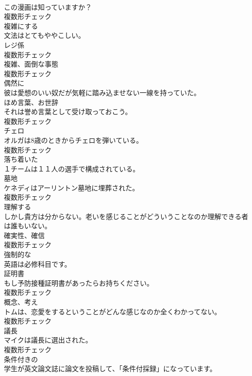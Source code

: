 \documentclass[8pt]{extreport}
\begin{document}
\begin{CJK}{UTF8}{min}
\\	この漫画は知っていますか？	
\\	複数形チェック
\\	[動詞]	複雑にする	
\\	文法はとてもややこしい。	
\\	[名詞]	レジ係	
\\	複数形チェック
\\	[名詞]	複雑、面倒な事態	
\\	複数形チェック
\\	[副詞]	偶然に	
\\	彼は愛想のいい奴だが気軽に踏み込ませない一線を持っていた。	
\\	[名詞]	ほめ言葉、お世辞	
\\	それは誉め言葉として受け取っておこう。	
\\	複数形チェック
\\	[名詞]	チェロ	
\\	オルガは8歳のときからチェロを弾いている。	
\\	複数形チェック
\\	[形容詞]	落ち着いた	
\\	１チームは１１人の選手で構成されている。	
\\	[名詞]	墓地	
\\	ケネディはアーリントン墓地に埋葬された。	
\\	複数形チェック
\\	[動詞]	理解する	
\\	しかし貴方は分からない。老いを感じることがどういうことなのか理解できる者は誰もいない。	
\\	[名詞]	確実性、確信	
\\	複数形チェック
\\	[形容詞]	強制的な	
\\	英語は必修科目です。	
\\	[名詞]	証明書	
\\	もし予防接種証明書があったらお持ちください。	
\\	複数形チェック
\\	[名詞]	概念、考え	
\\	トムは、恋愛をするということがどんな感じなのか全くわかってない。	
\\	複数形チェック
\\	[名詞]	議⻑	
\\	マイクは議長に選出された。	
\\	複数形チェック
\\	[形容詞]	条件付きの	
\\	学生が英文論文誌に論文を投稿して、「条件付採録」になっています。	

\end{CJK}
\end{document}
